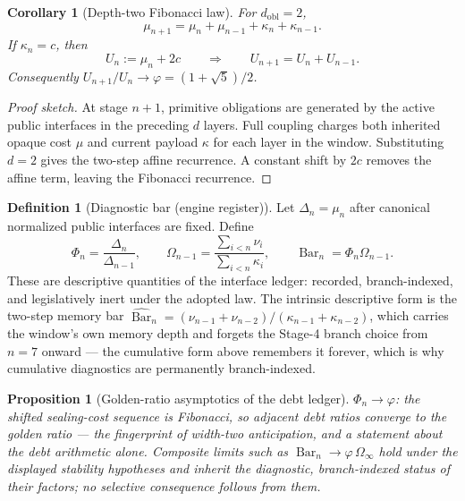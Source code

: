 \documentclass[11pt]{article}
\theoremstyle{plain}
\newtheorem{proposition}[theorem]{Proposition}
\newtheorem{corollary}[theorem]{Corollary}
\theoremstyle{definition}
\newtheorem{definition}[theorem]{Definition}
\theoremstyle{remark}
\newenvironment{proofsketch}{\begin{proof}[Proof sketch]}{\end{proof}}
\newcommand{\SelBar}{\operatorname{Bar}}
\begin{document}
\begin{corollary}[Depth-two Fibonacci law]
For \(d_{\mathrm{obl}}=2\),
\[
\mu_{n+1}=\mu_n+\mu_{n-1}+\kappa_n+\kappa_{n-1}.
\]
If \(\kappa_n=c\), then
\[
U_n:=\mu_n+2c
\qquad\Rightarrow\qquad
U_{n+1}=U_n+U_{n-1}.
\]
Consequently \(U_{n+1}/U_n\to\varphi=(1+\sqrt5)/2\).
\end{corollary}

\begin{proofsketch}
At stage \(n+1\), primitive obligations are generated by the active public interfaces in the preceding \(d\) layers. Full coupling charges both inherited opaque cost \(\mu\) and current payload \(\kappa\) for each layer in the window. Substituting \(d=2\) gives the two-step affine recurrence. A constant shift by \(2c\) removes the affine term, leaving the Fibonacci recurrence.
\end{proofsketch}

\begin{definition}[Diagnostic bar (engine register)]
Let \(\Delta_n=\mu_n\) after canonical normalized public interfaces are fixed. Define
\[
\Phi_n=\frac{\Delta_n}{\Delta_{n-1}},
\qquad
\Omega_{n-1}=\frac{\sum_{i<n}\nu_i}{\sum_{i<n}\kappa_i},
\qquad
\SelBar_n=\Phi_n\Omega_{n-1}.
\]
These are descriptive quantities of the interface ledger: recorded, branch-indexed, and legislatively inert under the adopted law. The intrinsic descriptive form is the two-step memory bar \(\widehat{\SelBar}_n=(\nu_{n-1}+\nu_{n-2})/(\kappa_{n-1}+\kappa_{n-2})\), which carries the window's own memory depth and forgets the Stage-4 branch choice from \(n=7\) onward --- the cumulative form above remembers it forever, which is why cumulative diagnostics are permanently branch-indexed.
\end{definition}

\begin{proposition}[Golden-ratio asymptotics of the debt ledger]
\(\Phi_n\to\varphi\): the shifted sealing-cost sequence is Fibonacci, so adjacent debt ratios converge to the golden ratio --- the fingerprint of width-two anticipation, and a statement about the \emph{debt} arithmetic alone. Composite limits such as \(\SelBar_n\to\varphi\,\Omega_\infty\) hold under the displayed stability hypotheses and inherit the diagnostic, branch-indexed status of their factors; no selective consequence follows from them.
\end{proposition}
\end{document}
